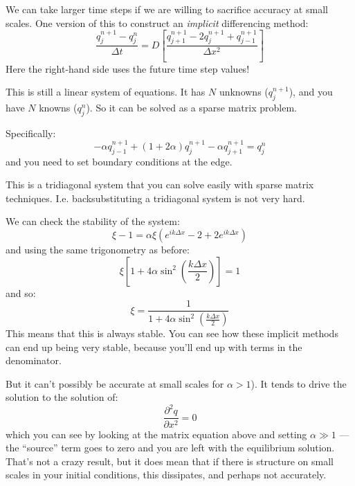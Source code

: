 We can take larger time steps if we are willing to sacrifice accuracy
at small scales. One version of this to construct an {\it implicit}
differencing method:
\begin{equation}
\frac{q_j^{n+1} - q_j^{n}}{\Delta t} = D \left[\frac{q_{j+1}^{n+1} - 2
q_j^{n+1} + q_{j-1}^{n+1}}{\Delta x^2}\right]
\end{equation}
Here the right-hand side uses the future time step values!


\begin{answer}
This is still a linear system of equations. It has $N$ unknowns
($q_j^{n+1}$), and you have $N$ knowns ($q_j^{n}$). So it can be solved
as a sparse matrix problem. 

Specifically:
\begin{equation}
-\alpha q_{j-1}^{n+1} + (1 + 2\alpha) q_j^{n+1} - \alpha q_{j+1}^{n+1}
 = q_j^n
\end{equation}
and you need to set boundary conditions at the edge.

This is a tridiagonal system that you can solve easily with sparse
matrix techniques. I.e. backsubstituting a tridiagonal system is not
very hard.
\end{answer}

We can check the stability of the system:
\begin{equation}
\xi - 1 = \alpha \xi \left(e^{ik\Delta x} - 2 + 2 e^{ik\Delta x}\right)
\end{equation}
and using the same trigonometry as before:
\begin{equation}
\xi \left[ 1+ 4 \alpha \sin^2\left(\frac{k\Delta x}{2}\right)\right] =
1
\end{equation}
and so:
\begin{equation}
\xi = \frac{1}{ 1+ 4 \alpha \sin^2\left(\frac{k\Delta x}{2}\right)}
\end{equation}
This means that this is always stable. You can see how these implicit
methods can end up being very stable, because you'll end up with terms
in the denominator.

But it can't possibly be accurate at small scales for $\alpha>1$). It
tends to drive the solution to the solution of:
\begin{equation}
\frac{\partial^2 q}{\partial x^2} = 0
\end{equation}
which you can see by looking at the matrix equation above and setting
$\alpha\gg 1$ --- the ``source'' term goes to zero and you are left
with the equilibrium solution.  That's not a crazy result, but it does
mean that if there is structure on small scales in your initial
conditions, this dissipates, and perhaps not accurately. 

